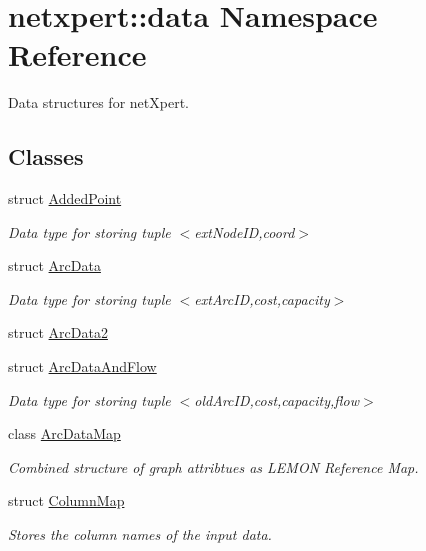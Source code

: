 \hypertarget{namespacenetxpert_1_1data}{}\section{netxpert\+:\+:data Namespace Reference}
\label{namespacenetxpert_1_1data}


Data structures for net\+Xpert.  


\subsection*{Classes}
\begin{DoxyCompactItemize}
\item 
struct \hyperlink{structnetxpert_1_1data_1_1AddedPoint}{Added\+Point}
\begin{DoxyCompactList}\small\item\em Data type for storing tuple $<$ext\+Node\+ID,coord$>$ \end{DoxyCompactList}\item 
struct \hyperlink{structnetxpert_1_1data_1_1ArcData}{Arc\+Data}
\begin{DoxyCompactList}\small\item\em Data type for storing tuple $<$ext\+Arc\+ID,cost,capacity$>$ \end{DoxyCompactList}\item 
struct \hyperlink{structnetxpert_1_1data_1_1ArcData2}{Arc\+Data2}
\item 
struct \hyperlink{structnetxpert_1_1data_1_1ArcDataAndFlow}{Arc\+Data\+And\+Flow}
\begin{DoxyCompactList}\small\item\em Data type for storing tuple $<$old\+Arc\+ID,cost,capacity,flow$>$ \end{DoxyCompactList}\item 
class \hyperlink{classnetxpert_1_1data_1_1ArcDataMap}{Arc\+Data\+Map}
\begin{DoxyCompactList}\small\item\em Combined structure of graph attribtues as L\+E\+M\+ON Reference Map. \end{DoxyCompactList}\item 
struct \hyperlink{structnetxpert_1_1data_1_1ColumnMap}{Column\+Map}
\begin{DoxyCompactList}\small\item\em Stores the column names of the input data. \end{DoxyCompactList}\item 

\end{DoxyCompactItemize}
